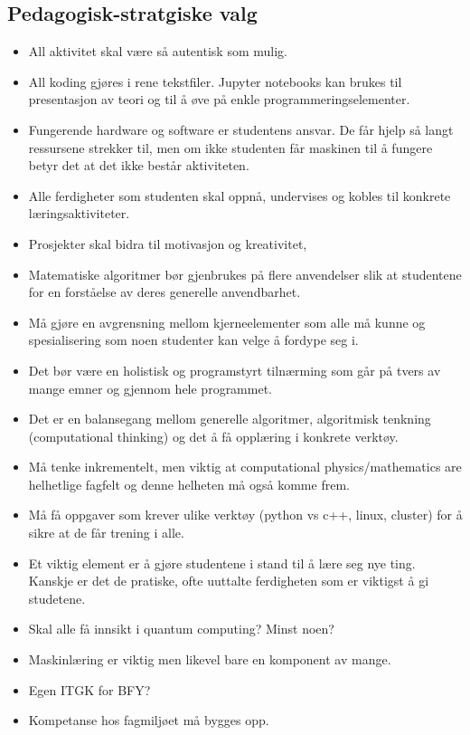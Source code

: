 \subsection{Pedagogisk-stratgiske valg}

\begin{itemize}
	\item All aktivitet skal være så autentisk som mulig.
	\item All koding gjøres i rene tekstfiler. Jupyter notebooks kan brukes til presentasjon av teori og til å øve på enkle programmeringselementer.
	\item Fungerende hardware og software er studentens ansvar. De får hjelp så langt ressursene strekker til, men om ikke studenten får maskinen til å fungere betyr det at det ikke består aktiviteten.
	\item Alle ferdigheter som studenten skal oppnå, undervises og kobles til konkrete læringsaktiviteter.
	\item Prosjekter skal bidra til motivasjon og kreativitet,
	\item Matematiske algoritmer bør gjenbrukes på flere anvendelser slik at studentene for en forståelse av deres generelle anvendbarhet.
	\item Må gjøre en avgrensning mellom kjerneelementer som alle må kunne og spesialisering som noen studenter kan velge å fordype seg i.
	\item Det bør være en holistisk og programstyrt tilnærming som går på tvers av mange emner og gjennom hele programmet. 
	\item Det er en balansegang mellom generelle algoritmer,  algoritmisk tenkning (computational thinking) og det å få opplæring i konkrete verktøy.
	\item Må tenke inkrementelt, men viktig at computational physics/mathematics are helhetlige fagfelt og denne helheten må også komme frem.
	\item Må få oppgaver som krever ulike verktøy (python vs c++, linux, cluster) for å sikre at de får trening i alle.
	\item Et viktig element er å gjøre studentene i stand til å lære seg nye ting. Kanskje er det de pratiske, ofte uuttalte ferdigheten som er viktigst å gi studetene.
	\item Skal alle få innsikt i quantum computing? Minst noen?
	\item Maskinlæring er viktig men likevel bare en komponent av mange.
	\item Egen ITGK for BFY?
	\item Kompetanse hos fagmiljøet må bygges opp.

\end{itemize}
